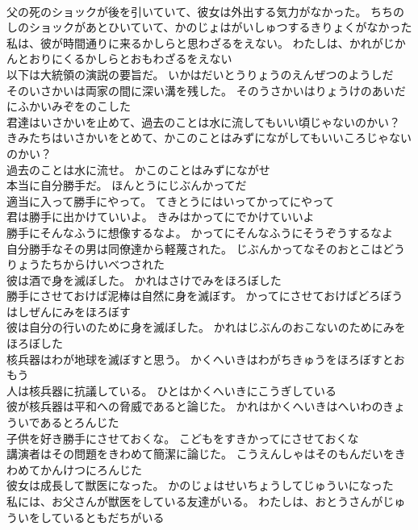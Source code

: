 \documentclass[8pt]{extreport}
\begin{document}
\begin{CJK}{UTF8}{min}
\\	父の死のショックが後を引いていて、彼女は外出する気力がなかった。	ちちのしのショックがあとひいていて、かのじょはがいしゅつするきりょくがなかった 
\\	私は、彼が時間通りに来るかしらと思わざるをえない。	わたしは、かれがじかんとおりにくるかしらとおもわざるをえない 
\\	以下は大統領の演説の要旨だ。	いかはだいとうりょうのえんぜつのようしだ 
\\	そのいさかいは両家の間に深い溝を残した。	そのうさかいはりょうけのあいだにふかいみぞをのこした 
\\	君達はいさかいを止めて、過去のことは水に流してもいい頃じゃないのかい？	きみたちはいさかいをとめて、かこのことはみずにながしてもいいころじゃないのかい？ 
\\	過去のことは水に流せ。	かこのことはみずにながせ 
\\	本当に自分勝手だ。	ほんとうにじぶんかってだ 
\\	適当に入って勝手にやって。	てきとうにはいってかってにやって 
\\	君は勝手に出かけていいよ。	きみはかってにでかけていいよ 
\\	勝手にそんなふうに想像するなよ。	かってにそんなふうにそうぞうするなよ 
\\	自分勝手なその男は同僚達から軽蔑された。	じぶんかってなそのおとこはどうりょうたちからけいべつされた 
\\	彼は酒で身を滅ぼした。	かれはさけでみをほろぼした 
\\	勝手にさせておけば泥棒は自然に身を滅ぼす。	かってにさせておけばどろぼうはしぜんにみをほろぼす 
\\	彼は自分の行いのために身を滅ぼした。	かれはじぶんのおこないのためにみをほろぼした 
\\	核兵器はわが地球を滅ぼすと思う。	かくへいきはわがちきゅうをほろぼすとおもう 
\\	人は核兵器に抗議している。	ひとはかくへいきにこうぎしている 
\\	彼が核兵器は平和への脅威であると論じた。	かれはかくへいきはへいわのきょういであるとろんじた 
\\	子供を好き勝手にさせておくな。	こどもをすきかってにさせておくな 
\\	講演者はその問題をきわめて簡潔に論じた。	こうえんしゃはそのもんだいをきわめてかんけつにろんじた 
\\	彼女は成長して獣医になった。	かのじょはせいちょうしてじゅういになった 
\\	私には、お父さんが獣医をしている友達がいる。	わたしは、おとうさんがじゅういをしているともだちがいる 

\end{CJK}
\end{document}
